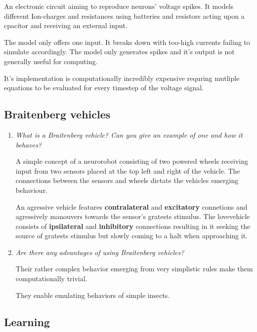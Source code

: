 \documentclass[
    fontsize      = 11pt,
    paper         = a4,
    twoside       = false,
    parskip       = half,
    pagesize      = false,
]{scrartcl}
\begin{document}
\begin{enumerate}
  An electronic circuit aiming to reproduce neurons' voltage spikes. It
  models different Ion-charges and resistances using batteries and
  resistors acting upon a cpacitor and receiving an external input.

  The model only offers one input. It breaks down with too-high currents
  failing to simulate accordingly. The model only generates spikes and
  it's output is not generally useful for computing.

  It's implementation is computationally incredibly expensive requring
  mutliple equations to be evaluated for every timestep of the voltage
  signal.
\end{enumerate}

\hypertarget{braitenberg-vehicles-1}{%
\subsection{Braitenberg vehicles}\label{braitenberg-vehicles-1}}

\begin{enumerate}
\def\labelenumi{\arabic{enumi}.}
\item
  \emph{What is a Braitenberg vehicle? Can you give an example of one
  and how it behaves?}

  A simple concept of a neurorobot consisting of two powered wheels
  receiving input from two sensors placed at the top left and right of
  the vehicle. The connections between the sensors and wheels dictate
  the vehicles emerging behaviour.

  An agressive vehicle features \textbf{contralateral} and
  \textbf{excitatory} connetions and agressively manouvers towards the
  sensor's gratests stimulus. The \glqq love\grqq vehicle consists of
  \textbf{ipsilateral} and \textbf{inhibitory} connections resulting in
  it seeking the source of gratests stimulus but slowly coming to a halt
  when approaching it.
\item
  \emph{Are there any advantages of using Braitenberg vehicles?}

  Their rather complex behavior emerging from very simplistic rules make
  them computationally trivial.

  They enable emulating behaviors of simple insects.
\end{enumerate}

\hypertarget{learning}{%
\subsection{Learning}\label{learning}}
\end{document}
